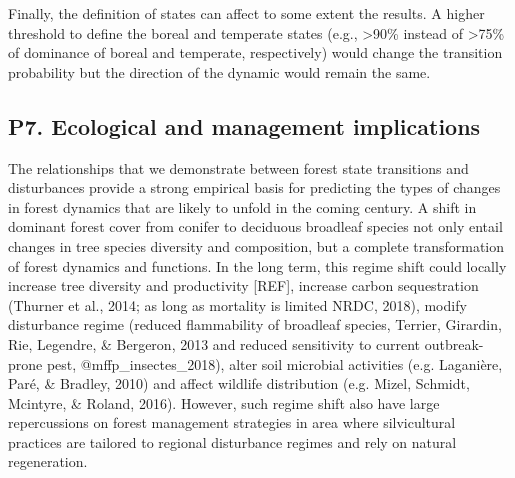 \documentclass[a4paperpaper,]{article}
\begin{document}
Finally, the definition of states can affect to some extent the results.
A higher threshold to define the boreal and temperate states (e.g.,
\textgreater{}90\% instead of \textgreater{}75\% of dominance of boreal
and temperate, respectively) would change the transition probability but
the direction of the dynamic would remain the same.

\hypertarget{p7.-ecological-and-management-implications}{%
\subsection{P7. Ecological and management
implications}\label{p7.-ecological-and-management-implications}}

The relationships that we demonstrate between forest state transitions
and disturbances provide a strong empirical basis for predicting the
types of changes in forest dynamics that are likely to unfold in the
coming century. A shift in dominant forest cover from conifer to
deciduous broadleaf species not only entail changes in tree species
diversity and composition, but a complete transformation of forest
dynamics and functions. In the long term, this regime shift could
locally increase tree diversity and productivity {[}REF{]}, increase
carbon sequestration (Thurner et al., 2014; as long as mortality is
limited NRDC, 2018), modify disturbance regime (reduced flammability of
broadleaf species, Terrier, Girardin, Rie, Legendre, \& Bergeron, 2013
and reduced sensitivity to current outbreak-prone pest,
@mffp\_insectes\_2018), alter soil microbial activities (e.g. Laganière,
Paré, \& Bradley, 2010) and affect wildlife distribution (e.g. Mizel,
Schmidt, Mcintyre, \& Roland, 2016). However, such regime shift also
have large repercussions on forest management strategies in area where
silvicultural practices are tailored to regional disturbance regimes and
rely on natural regeneration.
\end{document}
